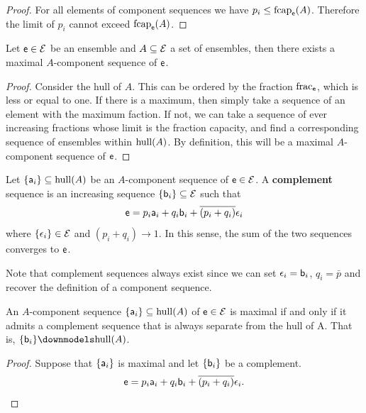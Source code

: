 \begin{proof}
	For all elements of component sequences we have $p_i \leq \fcap_{\ens}(A)$. Therefore the limit of $p_i$ cannot exceed $\fcap_{\ens}(A)$.
\end{proof}

\begin{prop}
	Let $\ens \in \Ens$ be an ensemble and $A \subseteq \Ens$ a set of ensembles, then there exists a maximal $A$-component sequence of $\ens$.
\end{prop}

\begin{proof}
	Consider the hull of $A$. This can be ordered by the fraction $\size_{\ens}$, which is less or equal to one. If there is a maximum, then simply take a sequence of an element with the maximum faction. If not, we can take a sequence of ever increasing fractions whose limit is the fraction capacity, and find a corresponding sequence of ensembles within $\hull(A)$. By definition, this will be a maximal $A$-component sequence of $\ens$.
\end{proof}

\begin{prop}
	Let $\{\ens[a]_i\} \subseteq \hull(A)$ be an $A$-component sequence of $\ens \in \Ens$. A \textbf{complement} sequence is an increasing sequence $\{\ens[b]_i\} \subseteq \Ens$ such that
	$$ \ens = p_i \ens[a]_i + q_i \ens[b]_i + \overline{(p_i + q_i)} \ens[\epsilon]_i $$
	where $\{\ens[\epsilon]_i\} \in \Ens$ and $(p_i + q_i) \to 1$. In this sense, the sum of the two sequences converges to $\ens$.
\end{prop}

\begin{remark}
	Note that complement sequences always exist since we can set $\ens[\epsilon]_i = \ens[b]_i$, $q_i = \bar{p}$ and recover the definition of a component sequence.
\end{remark}

\begin{prop}
	An $A$-component sequence $\{\ens[a]_i\} \subseteq \hull(A)$ of $\ens \in \Ens$ is maximal if and only if it admits a complement sequence that is always separate from the hull of A. That is, $\{\ens[b]_i\} \separate \hull(A)$.
\end{prop}

\begin{proof}
	Suppose that $\{\ens[a]_i\}$ is maximal and let $\{\ens[b]_i\}$ be a complement.
	$$ \ens = p_i \ens[a]_i + q_i \ens[b]_i + \overline{(p_i + q_i)} \ens[\epsilon]_i.$$
	
\end{proof}

